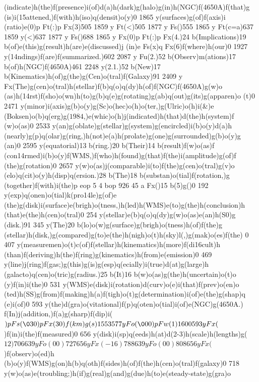 {{{{{{(indicate)h(the)f(presence)i(of)d(a)h(dark)g(halo)g(in)h(NGC)f(4650A)f(that)g
(is)i(\015attened,)f(with)h(iso)q(densit)o(y)0 1865 y(surfaces)g(of)f(axis)i
(ratio)e(0)p Ft(:)p Fx(3)505 1859 y Ft(<)505 1877 y Fs()555
1865 y Ft(c=a)637 1859 y(<)637 1877 y Fs()688 1865 y Fx(0)p
Ft(:)p Fx(4.)24 b(Implications)19 b(of)e(this)g(result)h(are)e(discussed)j
(in)e Fs(x)q Fx(6)f(where)h(our)0 1927 y(\014ndings)f(are)f(summarized.)602
2087 y Fu(2.)52 b(Observ)m(ations)17 b(of)h(NGC)f(4650A)461
2248 y(2.1.)52 b(New)17 b(Kinematics)h(of)g(the)g(Cen)o(tral)f(Galaxy)91
2409 y Fx(The)g(cen)o(tral)h(stellar)f(b)q(o)q(dy)h(of)f(NGC)f(4650A)g(w)o
(as)h(\014rst)f(sho)o(wn)h(to)g(b)q(e)g(rotating)g(ab)q(out)g(its)g(apparen)o
(t)0 2471 y(minor)i(axis)g(b)o(y)g(Sc)o(hec)o(h)o(ter,)g(Ulric)o(h)i(&)e
(Boksen)o(b)q(erg)g(\(1984\),)e(whic)o(h)j(indicated)h(that)d(the)h(system)f
(w)o(as)0 2533 y(an)g(oblate)g(stellar)g(system)g(encircled)i(b)o(y)d(a)h
(nearly)g(p)q(olar)g(ring,)h(not)e(a)h(prolate)g(one)g(surrounded)g(b)o(y)g
(an)0 2595 y(equatorial)13 b(ring.)20 b(Their)14 b(result)f(w)o(as)f
(con\014rmed)i(b)o(y)f(WMS,)f(who)h(found)g(that)f(the)i(amplitude)g(of)f
(the)g(rotation)0 2657 y(w)o(as)j(comparable)i(to)f(the)g(cen)o(tral)g(v)o
(elo)q(cit)o(y)h(disp)q(ersion.)28 b(The)18 b(substan)o(tial)f(rotation,)g
(together)f(with)i(the)p eop
5 4 bop 926 45 a Fx({)15 b(5)g({)0 192 y(exp)q(onen)o(tial)k(pro\014le)g(of)e
(the)g(disk)i(surface)e(brigh)o(tness,)h(led)h(WMS)e(to)g(the)h(conclusion)h
(that)e(the)h(cen)o(tral)0 254 y(stellar)e(b)q(o)q(dy)g(w)o(as)e(an)h(S0)g
(disk.)91 345 y(The)20 b(lo)o(w)g(surface)g(brigh)o(tness)h(of)f(the)g
(stellar)h(disk,)g(compared)g(to)e(the)h(nigh)o(t)h(sky)l(,)g(mak)o(es)f(the)
0 407 y(measuremen)o(t)c(of)f(stellar)h(kinematics)h(more)f(di\016cult)h
(than)f(deriving)h(the)f(ring)g(kinematics)h(from)e(emission)0
469 y(line)j(ring)f(gas;)g(this)g(is)g(esp)q(ecially)i(true)d(at)g(large)h
(galacto)q(cen)o(tric)g(radius.)25 b(It)16 b(w)o(as)g(the)h(uncertain)o(t)o
(y)f(in)i(the)0 531 y(WMS)e(disk)i(rotation)d(curv)o(e)i(that)f(prev)o(en)o
(ted)h(SS)g(from)f(making)h(a)f(tigh)o(t)g(determination)i(of)e(the)g(shap)q
(e)i(of)0 593 y(the)d(gra)o(vitational)f(p)q(oten)o(tial)i(of)e(NGC)g(4650A.)
f(In)j(addition,)f(a)g(sharp)f(dip)i(\()p Fs(\030)p Fx(30)f(km)g(s)1553
577 y Fo(\000)p Fw(1)1600 593 y Fx(\))f(in)i(the)f(measured)0
656 y(disk)i(sp)q(eeds)h(at)d(2-3)h(scale)h(lengths)g(\(12)706
639 y Fo(00)727 656 y Fx(-16)788 639 y Fo(00)808 656 y Fx(\))f(observ)o(ed)h
(b)o(y)f(WMS)g(on)h(b)q(oth)f(sides)h(of)f(the)h(cen)o(tral)f(galaxy)0
718 y(w)o(as)e(troubling;)h(if)g(real)g(and)g(due)h(to)e(steady-state)g(gra)o
}}}}}}}}
